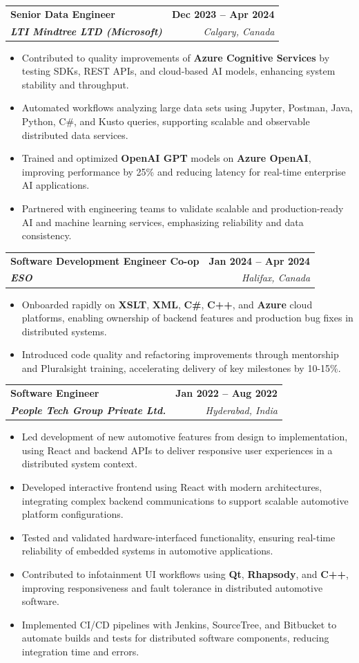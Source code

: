 \documentclass[letterpaper,11pt]{article}
\makeatletter
\newcommand{\resumeItem}[1]{
  \item\small{
    {#1 \vspace{-2pt}}
  }
}
\newcommand{\resumeSubheading}[4]{
  \vspace{-2pt}\item
    \begin{tabular*}{1.0\textwidth}[t]{l@{\extracolsep{\fill}}r}
      \textbf{#1} & \textbf{\small #2} \\
      \textit{\small#3} & \textit{\small #4} \\
    \end{tabular*}\vspace{-7pt}
}
\newcommand{\resumeItemListStart}{\begin{itemize}}
\newcommand{\resumeItemListEnd}{\end{itemize}\vspace{-5pt}}
\makeatother
\begin{document}
    \resumeSubheading
      {\textbf{Senior Data Engineer}}{\textbf{Dec 2023 -- Apr 2024}}
      {\textbf{LTI Mindtree LTD (Microsoft)}}{Calgary, Canada}
      \resumeItemListStart
        \resumeItem{Contributed to quality improvements of \textbf{Azure Cognitive Services} by testing SDKs, REST APIs, and cloud-based AI models, enhancing system stability and throughput.}
        \resumeItem{Automated workflows analyzing large data sets using Jupyter, Postman, Java, Python, C\#, and Kusto queries, supporting scalable and observable distributed data services.}
        \resumeItem{Trained and optimized \textbf{OpenAI GPT} models on \textbf{Azure OpenAI}, improving performance by 25\% and reducing latency for real-time enterprise AI applications.}
        \resumeItem{Partnered with engineering teams to validate scalable and production-ready AI and machine learning services, emphasizing reliability and data consistency.}
      \resumeItemListEnd
    
    \resumeSubheading
      {\textbf{Software Development Engineer Co-op}}{\textbf{Jan 2024 -- Apr 2024}}
      {\textbf{ESO}}{Halifax, Canada}
      \resumeItemListStart
        \resumeItem{Onboarded rapidly on \textbf{XSLT}, \textbf{XML}, \textbf{C\#}, \textbf{C++}, and \textbf{Azure} cloud platforms, enabling ownership of backend features and production bug fixes in distributed systems.}
        \resumeItem{Introduced code quality and refactoring improvements through mentorship and Pluralsight training, accelerating delivery of key milestones by 10-15\%.}
      \resumeItemListEnd

    \resumeSubheading
      {\textbf{Software Engineer}}{\textbf{Jan 2022 -- Aug 2022}}
      {\textbf{People Tech Group Private Ltd.}}{Hyderabad, India}
      \resumeItemListStart
        \resumeItem{Led development of new automotive features from design to implementation, using React and backend APIs to deliver responsive user experiences in a distributed system context.}
        \resumeItem{Developed interactive frontend using React with modern architectures, integrating complex backend communications to support scalable automotive platform configurations.}
        \resumeItem{Tested and validated hardware-interfaced functionality, ensuring real-time reliability of embedded systems in automotive applications.}
        \resumeItem{Contributed to infotainment UI workflows using \textbf{Qt}, \textbf{Rhapsody}, and \textbf{C++}, improving responsiveness and fault tolerance in distributed automotive software.}
        \resumeItem{Implemented CI/CD pipelines with Jenkins, SourceTree, and Bitbucket to automate builds and tests for distributed software components, reducing integration time and errors.}
      \resumeItemListEnd
\end{document}
